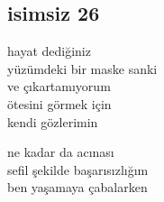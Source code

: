 \subsection{isimsiz 26}

hayat dediğiniz \\
yüzümdeki bir maske sanki \\
ve çıkartamıyorum \\
ötesini görmek için \\
kendi gözlerimin

\noindent\newline
ne kadar da acınası \\
sefil şekilde başarısızlığım \\
ben yaşamaya çabalarken